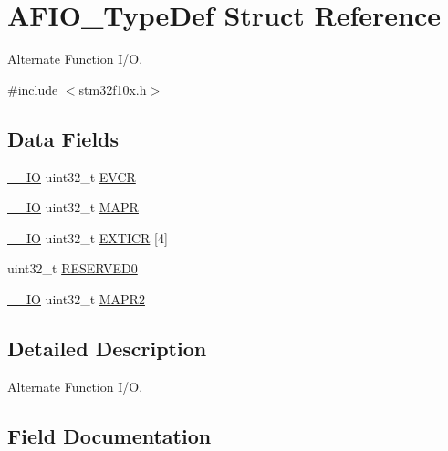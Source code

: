 \hypertarget{struct_a_f_i_o___type_def}{}\section{A\+F\+I\+O\+\_\+\+Type\+Def Struct Reference}
\label{struct_a_f_i_o___type_def}


Alternate Function I/O.  




{\ttfamily \#include $<$stm32f10x.\+h$>$}

\subsection*{Data Fields}
\begin{DoxyCompactItemize}
\item 
\mbox{\hyperlink{core__sc300_8h_aec43007d9998a0a0e01faede4133d6be}{\+\_\+\+\_\+\+IO}} uint32\+\_\+t \mbox{\hyperlink{struct_a_f_i_o___type_def_ade0e8d03661dcb48d09182f4beb41b32}{E\+V\+CR}}
\item 
\mbox{\hyperlink{core__sc300_8h_aec43007d9998a0a0e01faede4133d6be}{\+\_\+\+\_\+\+IO}} uint32\+\_\+t \mbox{\hyperlink{struct_a_f_i_o___type_def_a9f3b56f295c863e23ed4c82380b1d621}{M\+A\+PR}}
\item 
\mbox{\hyperlink{core__sc300_8h_aec43007d9998a0a0e01faede4133d6be}{\+\_\+\+\_\+\+IO}} uint32\+\_\+t \mbox{\hyperlink{struct_a_f_i_o___type_def_a52f7bf8003ba69d66a4e86dea6eeab65}{E\+X\+T\+I\+CR}} \mbox{[}4\mbox{]}
\item 
uint32\+\_\+t \mbox{\hyperlink{struct_a_f_i_o___type_def_af86c61a5d38a4fc9cef942a12744486b}{R\+E\+S\+E\+R\+V\+E\+D0}}
\item 
\mbox{\hyperlink{core__sc300_8h_aec43007d9998a0a0e01faede4133d6be}{\+\_\+\+\_\+\+IO}} uint32\+\_\+t \mbox{\hyperlink{struct_a_f_i_o___type_def_a12f2941917fe1e4000af10d1793f8e49}{M\+A\+P\+R2}}
\end{DoxyCompactItemize}


\subsection{Detailed Description}
Alternate Function I/O. 

\subsection{Field Documentation}
\mbox{\label{struct_a_f_i_o___type_def_ade0e8d03661dcb48d09182f4beb41b32}} 
